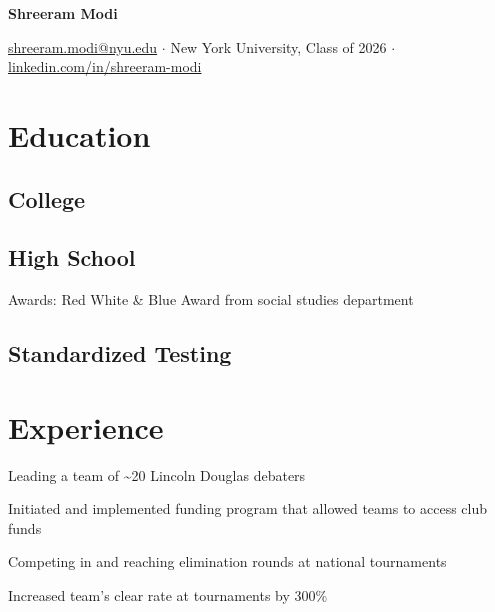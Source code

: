 \documentclass[letterpaper]{resume-shreeram}
\begin{document}
\begin{center}
  {\Huge \bfseries Shreeram Modi}

  \href{mailto:shreeram.modi@nyu.edu}{shreeram.modi@nyu.edu}
  $\cdot$
  New York University, Class of 2026
  $\cdot$
  \href{https://linkedin.com/in/shreeram-modi}{linkedin.com/in/shreeram-modi}
\end{center}

\section{Education}

\subsection{College}


\subsection{High School}

\begin{compactitem}
  \item Awards: Red White \& Blue Award from social studies department
\end{compactitem}

\subsection{Standardized Testing}


\section{Experience}

\begin{compactitem}
    \item Leading a team of \textasciitilde{}20 Lincoln Douglas debaters

    \item Initiated and implemented funding program that allowed teams
      to access club funds

    \item Competing in and reaching elimination rounds at national tournaments

    \item Increased team's clear rate at tournaments by 300\%
\end{compactitem}
\end{document}
